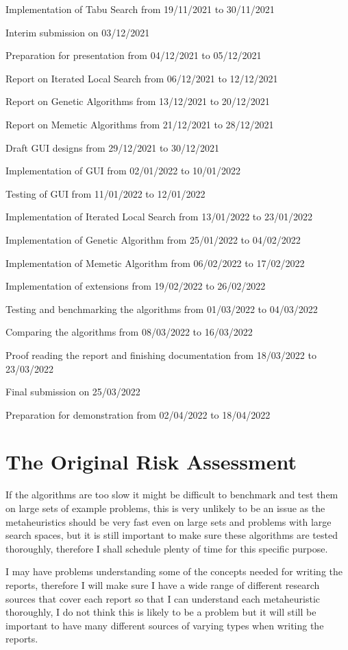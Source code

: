 \documentclass[]{final_report}
\begin{document}
Implementation of Tabu Search from 19/11/2021 to 30/11/2021

Interim submission on 03/12/2021

Preparation for presentation from 04/12/2021 to 05/12/2021

Report on Iterated Local Search from 06/12/2021 to 12/12/2021

Report on Genetic Algorithms from 13/12/2021 to 20/12/2021

Report on Memetic Algorithms from 21/12/2021 to 28/12/2021

Draft GUI designs from 29/12/2021 to 30/12/2021

Implementation of GUI from 02/01/2022 to 10/01/2022

Testing of GUI from 11/01/2022 to 12/01/2022

Implementation of Iterated Local Search from 13/01/2022 to 23/01/2022

Implementation of Genetic Algorithm from 25/01/2022 to 04/02/2022

Implementation of Memetic Algorithm from 06/02/2022 to 17/02/2022

Implementation of extensions from 19/02/2022 to 26/02/2022

Testing and benchmarking the algorithms from 01/03/2022 to 04/03/2022

Comparing the algorithms from 08/03/2022 to 16/03/2022

Proof reading the report and finishing documentation from 18/03/2022 to 23/03/2022

Final submission on 25/03/2022

Preparation for demonstration from 02/04/2022 to 18/04/2022

\newpage
\section*{The Original Risk Assessment}

If the algorithms are too slow it might be difficult to benchmark and test them on large sets of example problems, this is very unlikely to be an issue as the metaheuristics should be very fast even on large sets and problems with large search spaces, but it is still important to make sure these algorithms are tested thoroughly, therefore I shall schedule plenty of time for this specific purpose.

I may have problems understanding some of the concepts needed for writing the reports, therefore I will make sure I have a wide range of different research sources that cover each report so that I can understand each metaheuristic thoroughly, I do not think this is likely to be a problem but it will still be important to have many different sources of varying types when writing the reports.
\end{document}
